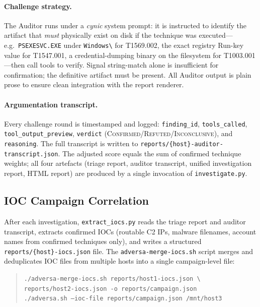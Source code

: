 \documentclass[sigconf, nonacm]{acmart}
\begin{document}
\paragraph{Challenge strategy.}
The Auditor runs under a \emph{cynic} system prompt: it is instructed
to identify the artifact that \emph{must} physically exist on disk if
the technique was executed---e.g.\ \texttt{PSEXESVC.EXE} under
\texttt{Windows\textbackslash} for T1569.002, the exact registry
Run-key value for T1547.001, a credential-dumping binary on the
filesystem for T1003.001---then call tools to verify.  Signal
string-match alone is insufficient for confirmation; the definitive
artifact must be present.  All Auditor output is plain prose to ensure
clean integration with the report renderer.

\paragraph{Argumentation transcript.}
Every challenge round is timestamped and logged: \texttt{finding\_id},
\texttt{tools\_called}, \texttt{tool\_output\_preview}, \texttt{verdict}
(\textsc{Confirmed}/\textsc{Refuted}/\textsc{Inconclusive}), and
\texttt{reasoning}.  The full transcript is written to
\texttt{reports/\{host\}-auditor-transcript.json}. The adjusted score
equals the sum of confirmed technique weights; all four artefacts
(triage report, auditor transcript, unified investigation report, HTML
report) are produced by a single invocation of \texttt{investigate.py}.

\subsection{IOC Campaign Correlation}
\label{sec:ioc}

After each investigation, \texttt{extract\_iocs.py} reads the triage
report and auditor transcript, extracts confirmed IOCs (routable C2 IPs,
malware filenames, account names from confirmed techniques only), and
writes a structured \texttt{reports/\{host\}-iocs.json} file.  The
\texttt{adversa-merge-iocs.sh} script merges and deduplicates IOC files
from multiple hosts into a single campaign-level file:

\begin{quote}\small
\texttt{./adversa-merge-iocs.sh reports/host1-iocs.json \textbackslash \\
\phantom{....}reports/host2-iocs.json -o reports/campaign.json} \\
\texttt{./adversa.sh --ioc-file reports/campaign.json /mnt/host3}
\end{quote}
\end{document}

